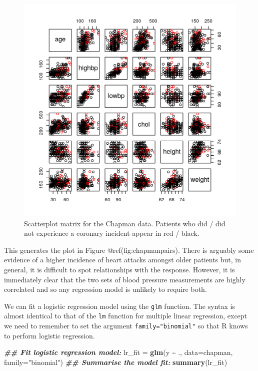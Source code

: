 \documentclass[
]{article}
\newenvironment{Shaded}{\begin{snugshade}}{\end{snugshade}}
\newcommand{\AttributeTok}[1]{\textcolor[rgb]{0.13,0.29,0.53}{#1}}
\newcommand{\DocumentationTok}[1]{\textcolor[rgb]{0.56,0.35,0.01}{\textbf{\textit{#1}}}}
\newcommand{\FunctionTok}[1]{\textcolor[rgb]{0.13,0.29,0.53}{\textbf{#1}}}
\newcommand{\NormalTok}[1]{#1}
\newcommand{\OtherTok}[1]{\textcolor[rgb]{0.56,0.35,0.01}{#1}}
\newcommand{\SpecialCharTok}[1]{\textcolor[rgb]{0.81,0.36,0.00}{\textbf{#1}}}
\newcommand{\StringTok}[1]{\textcolor[rgb]{0.31,0.60,0.02}{#1}}
\begin{document}
\begin{figure}[th]

{\centering \includegraphics{chapmanpairs-1} 

}

\caption{Scatterplot matrix for the Chapman data. Patients who did / did not experience a coronary incident appear in red / black. }\label{fig:chapmanpairs}
\end{figure}

This generates the plot in Figure @ref(fig:chapmanpairs). There is
arguably some evidence of a higher incidence of heart attacks amongst
older patients but, in general, it is difficult to spot relationships
with the response. However, it is immediately clear that the two sets of
blood pressure measurements are highly correlated and so any regression
model is unlikely to require both.

We can fit a logistic regression model using the \texttt{glm} function.
The syntax is almost identical to that of the \texttt{lm} function for
multiple linear regression, except we need to remember to set the
argument \texttt{family="binomial"} so that R knows to perform logistic
regression.

\begin{Shaded}
\begin{Highlighting}[]
\DocumentationTok{\#\# Fit logistic regression model:}
\NormalTok{lr\_fit }\OtherTok{=} \FunctionTok{glm}\NormalTok{(y }\SpecialCharTok{\textasciitilde{}}\NormalTok{ ., }\AttributeTok{data=}\NormalTok{chapman, }\AttributeTok{family=}\StringTok{"binomial"}\NormalTok{)}
\DocumentationTok{\#\# Summarise the model fit:}
\FunctionTok{summary}\NormalTok{(lr\_fit)}
\end{Highlighting}
\end{Shaded}
\end{document}
